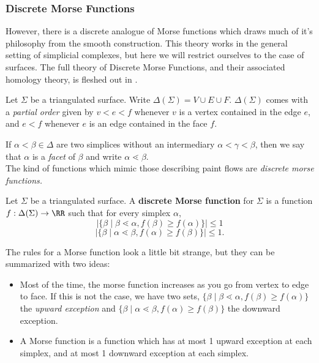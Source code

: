 \subsubsection{Discrete Morse Functions}
\begin{projectdescription}
However, there is a discrete analogue of Morse functions which draws much of it's philosophy from the smooth construction.\label{proj:morsetheory} This theory works in the general setting of simplicial complexes, but here we will restrict ourselves to the case of surfaces. The full theory of Discrete Morse Functions, and their associated homology theory, is fleshed out in \cite{forman2002user}. 
\end{projectdescription}
\begin{definition}
Let $\Sigma$ be a triangulated surface. Write $\Delta(\Sigma)= V\cup E\cup F$. $\Delta(\Sigma)$ comes with a \emph{partial order} given by $v<e<f$ whenever $v$ is a vertex contained in the edge $e$, and $e<f$ whenever $e$ is an edge contained in the face $f$. \\
\end{definition}
If $\alpha< \beta \in \Delta$ are two simplices without an intermediary $\alpha<\gamma<\beta$, then we say that $\alpha$ is a \emph{facet} of $\beta$ and write $\alpha\lessdot\beta$. \\
The kind of functions which mimic those describing paint flows are \emph{discrete morse functions. } 
\begin{definition}
Let $\Sigma$ be a triangulated surface. A \textbf{discrete Morse function} for $\Sigma$ is a function $f: \Delta(\Sigma)\to \RR$ such that for every simplex $\alpha$,
\[|\{\beta \;|\; \beta\lessdot \alpha ,  f(\beta)\geq f(\alpha)\}|\leq 1\]
\[|\{\beta \;|\; \alpha\lessdot \beta ,  f(\alpha)\geq f(\beta)\}|\leq 1.\]
\end{definition}
The rules for a Morse function look a little bit strange, but they can be summarized with two ideas:
\begin{itemize}
\item  Most of the time, the morse function increases as you go from vertex to edge to face. If this is not the case, we have two sets,  $\{\beta \;|\; \beta\lessdot \alpha ,  f(\beta)\geq f(\alpha)\}$ the \emph{upward exception} and $\{\beta \;|\; \alpha\lessdot \beta ,  f(\alpha)\geq f(\beta)\}$ the downward exception. 
\item A Morse function is a function which has at most 1 upward exception at each simplex, and at most 1 downward exception at each simplex. 
\end{itemize}
